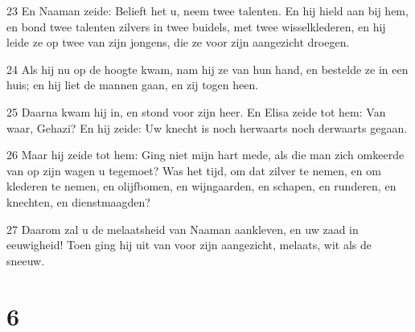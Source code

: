 \par 23 En Naaman zeide: Belieft het u, neem twee talenten. En hij hield aan bij hem, en bond twee talenten zilvers in twee buidels, met twee wisselklederen, en hij leide ze op twee van zijn jongens, die ze voor zijn aangezicht droegen.
\par 24 Als hij nu op de hoogte kwam, nam hij ze van hun hand, en bestelde ze in een huis; en hij liet de mannen gaan, en zij togen heen.
\par 25 Daarna kwam hij in, en stond voor zijn heer. En Elisa zeide tot hem: Van waar, Gehazi? En hij zeide: Uw knecht is noch herwaarts noch derwaarts gegaan.
\par 26 Maar hij zeide tot hem: Ging niet mijn hart mede, als die man zich omkeerde van op zijn wagen u tegemoet? Was het tijd, om dat zilver te nemen, en om klederen te nemen, en olijfbomen, en wijngaarden, en schapen, en runderen, en knechten, en dienstmaagden?
\par 27 Daarom zal u de melaatsheid van Naaman aankleven, en uw zaad in eeuwigheid! Toen ging hij uit van voor zijn aangezicht, melaats, wit als de sneeuw.

\chapter{6}

